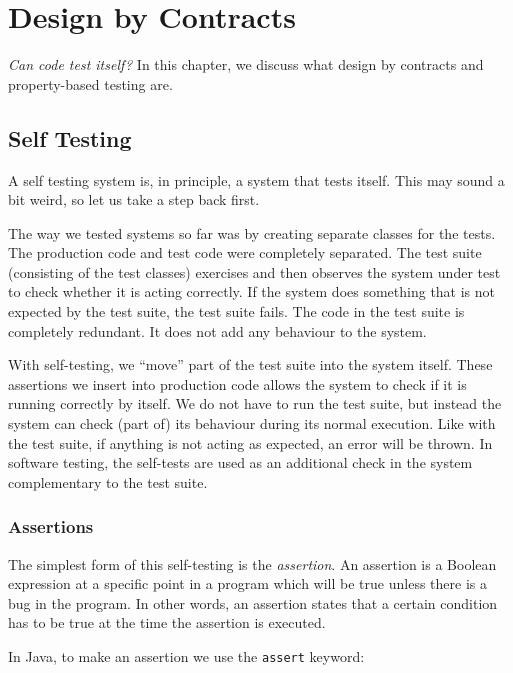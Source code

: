 \hypertarget{design-by-contracts}{%
\section{Design by Contracts}\label{design-by-contracts}}

\emph{Can code test itself?} In this chapter, we discuss what design by
contracts and property-based testing are.

\hypertarget{self-testing}{%
\subsection{Self Testing}\label{self-testing}}

A self testing system is, in principle, a system that tests itself. This
may sound a bit weird, so let us take a step back first.

The way we tested systems so far was by creating separate classes for
the tests. The production code and test code were completely separated.
The test suite (consisting of the test classes) exercises and then
observes the system under test to check whether it is acting correctly.
If the system does something that is not expected by the test suite, the
test suite fails. The code in the test suite is completely redundant. It
does not add any behaviour to the system.

With self-testing, we ``move'' part of the test suite into the system
itself. These assertions we insert into production code allows the
system to check if it is running correctly by itself. We do not have to
run the test suite, but instead the system can check (part of) its
behaviour during its normal execution. Like with the test suite, if
anything is not acting as expected, an error will be thrown. In software
testing, the self-tests are used as an additional check in the system
complementary to the test suite.

\hypertarget{assertions}{%
\subsubsection{Assertions}\label{assertions}}

The simplest form of this self-testing is the \emph{assertion}. An
assertion is a Boolean expression at a specific point in a program which
will be true unless there is a bug in the program. In other words, an
assertion states that a certain condition has to be true at the time the
assertion is executed.

In Java, to make an assertion we use the \texttt{assert} keyword:

